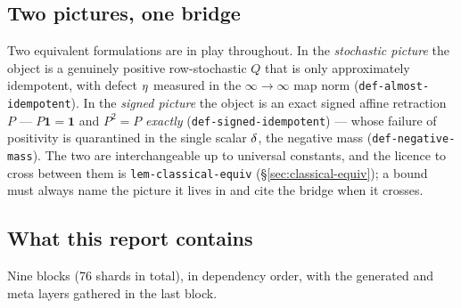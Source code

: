 \subsection*{Two pictures, one bridge}

Two equivalent formulations are in play throughout. In the \emph{stochastic picture}
the object is a genuinely positive row-stochastic $Q$ that is only approximately
idempotent, with defect $\eta$ measured in the $\infty\!\to\!\infty$ map norm
(\texttt{def-almost-idempotent}). In the \emph{signed picture} the object is an exact
signed affine retraction $P$ --- $P\mathbf1=\mathbf1$ and $P^2=P$ \emph{exactly}
(\texttt{def-signed-idempotent}) --- whose failure of positivity is quarantined in the
single scalar $\delta$, the negative mass (\texttt{def-negative-mass}). The two are
interchangeable up to universal constants, and the licence to cross between them is
\texttt{lem-classical-equiv} (\S\ref{sec:classical-equiv}); a bound must always name
the picture it lives in and cite the bridge when it crosses.

\subsection*{What this report contains}

Nine blocks (76 shards in total), in dependency order, with the generated and meta
layers gathered in the last block.

